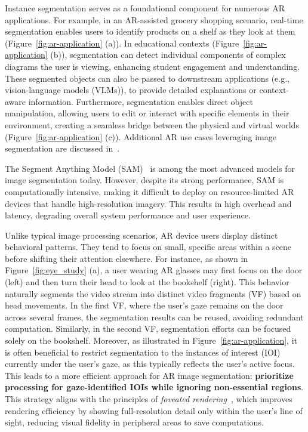 \documentclass{article}
\begin{document}
Instance segmentation serves as a foundational component for numerous AR applications. For example, in an AR-assisted grocery shopping scenario, real-time segmentation enables users to identify products on a shelf as they look at them (Figure~\ref{fig:ar-application} (a)). In educational contexts (Figure~\ref{fig:ar-application} (b)), segmentation can detect individual components of complex diagrams the user is viewing, enhancing student engagement and understanding. These segmented objects can also be passed to downstream applications (e.g., vision-language models (VLMs)), to provide detailed explanations or context-aware information. Furthermore, segmentation enables direct object manipulation, allowing users to edit or interact with specific elements in their environment, creating a seamless bridge between the physical and virtual worlds (Figure~\ref{fig:ar-application} (c)). Additional AR use cases leveraging image segmentation are discussed in~\cite{gonzalez2019applications, gonzalez2020nextmed, tanzi2021real, alhaija2017augmented}.

The Segment Anything Model (SAM)~\cite{kirillov2023segment, ravi2024sam} is among the most advanced models for image segmentation today. However, despite its strong performance, SAM is computationally intensive, making it difficult to deploy on resource-limited AR devices that handle high-resolution imagery. This results in high overhead and latency, degrading overall system performance and user experience.

Unlike typical image processing scenarios, AR device users display distinct behavioral patterns. They tend to focus on small, specific areas within a scene before shifting their attention elsewhere. For instance, as shown in Figure~\ref{fig:eye_study} (a), a user wearing AR glasses may first focus on the door (left) and then turn their head to look at the bookshelf (right). This behavior naturally segments the video stream into distinct video fragments (VF) based on head movements. In the first VF, where the user’s gaze remains on the door across several frames, the segmentation results can be reused, avoiding redundant computation. Similarly, in the second VF, segmentation efforts can be focused solely on the bookshelf.
Moreover, as illustrated in Figure~\ref{fig:ar-application}, it is often beneficial to restrict segmentation to the instances of interest (IOI) currently under the user’s gaze, as this typically reflects the user’s active focus. This leads to a more efficient approach for AR image segmentation: \textbf{prioritize processing for gaze-identified IOIs while ignoring non-essential regions}. This strategy aligns with the principles of \textit{foveated rendering}~\cite{patney2016towards}, which improves rendering efficiency by showing full-resolution detail only within the user’s line of sight, reducing visual fidelity in peripheral areas to save computations.
\end{document}
